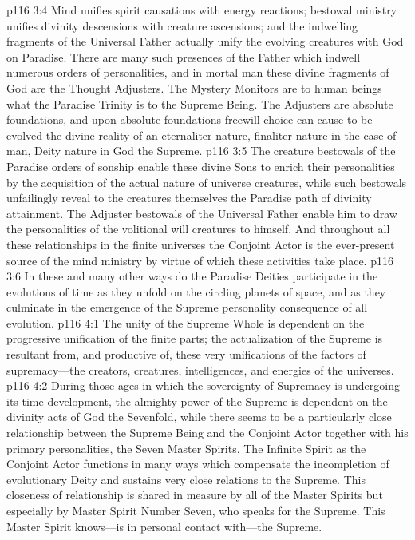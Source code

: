 \pc \vs p116 3:4 \bibnobreakspace {} Mind unifies spirit causations with energy reactions; bestowal ministry unifies divinity descensions with creature ascensions; and the indwelling fragments of the Universal Father actually unify the evolving creatures with God on Paradise. There are many such presences of the Father which indwell numerous orders of personalities, and in mortal man these divine fragments of God are the Thought Adjusters. The Mystery Monitors are to human beings what the Paradise Trinity is to the Supreme Being. The Adjusters are absolute foundations, and upon absolute foundations freewill choice can cause to be evolved the divine reality of an eternaliter nature, finaliter nature in the case of man, Deity nature in God the Supreme.
\pc \vs p116 3:5 The creature bestowals of the Paradise orders of sonship enable these divine Sons to enrich their personalities by the acquisition of the actual nature of universe creatures, while such bestowals unfailingly reveal to the creatures themselves the Paradise path of divinity attainment. The Adjuster bestowals of the Universal Father enable him to draw the personalities of the volitional will creatures to himself. And throughout all these relationships in the finite universes the Conjoint Actor is the ever\hyp{}present source of the mind ministry by virtue of which these activities take place.
\vs p116 3:6 In these and many other ways do the Paradise Deities participate in the evolutions of time as they unfold on the circling planets of space, and as they culminate in the emergence of the Supreme personality consequence of all evolution.
\vs p116 4:1 The unity of the Supreme Whole is dependent on the progressive unification of the finite parts; the actualization of the Supreme is resultant from, and productive of, these very unifications of the factors of supremacy---the creators, creatures, intelligences, and energies of the universes.
\pc \vs p116 4:2 During those ages in which the sovereignty of Supremacy is undergoing its time development, the almighty power of the Supreme is dependent on the divinity acts of God the Sevenfold, while there seems to be a particularly close relationship between the Supreme Being and the Conjoint Actor together with his primary personalities, the Seven Master Spirits. The Infinite Spirit as the Conjoint Actor functions in many ways which compensate the incompletion of evolutionary Deity and sustains very close relations to the Supreme. This closeness of relationship is shared in measure by all of the Master Spirits but especially by Master Spirit Number Seven, who speaks for the Supreme. This Master Spirit knows---is in personal contact with---the Supreme.
